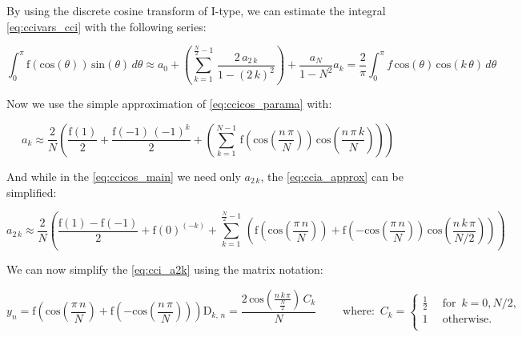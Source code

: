 \documentclass[12pt,twoside,a4paper]{article}
\numberwithin{equation}{subsection}
\numberwithin{figure}{subsection}
\begin{document}
By using the discrete cosine transform of I-type, we can estimate the integral \ref{eq:ccivars_cci} with the following series:

\begin{subequations} \label{eq:cci_costrans}
  \begin{equation}   \label{eq:ccicos_main}
    \int_{0}^{\pi }\mathrm{f}(\mathrm{cos}(\theta ))\,\mathrm{sin}(\theta )\,d\theta \approx {a_{0}} +  \left( \! \sum_{k=1}^{\frac
    {N}{2} - 1}\,\frac {2\, {a_{2\,k}}}{1 - (2\,k)^{2}} \!  \right) + \frac {{a_{N}}}{1 - N ^{2}}  
  \end{equation}
  \begin{equation}   \label{eq:ccicos_parama}
    {a_{k}}=\frac {2}{\pi } \int_{0}^{\pi }f\,\mathrm{cos}(\theta )\, \mathrm{cos}(k\,\theta )\,d\theta   
  \end{equation}
\end{subequations}

Now we use the simple approximation of \ref{eq:ccicos_parama} with:

\begin{equation} \label{eq:ccia_approx}
  {a_{k}} \approx \frac {2}{N} \left(\! \frac {\mathrm{f}(1)}{2} + \frac {\mathrm{f}( - 1)\,( - 1)^{k}}{2} +  \left( \!
  \sum_{k=1}^{N - 1}\, \mathrm{f}(\mathrm{cos}(\frac {n\,\pi }{N}))\,\mathrm{cos}(\frac {n\,\pi \,k}{N}) \!  \right)  \right) 
\end{equation}
 
And while in the \ref{eq:ccicos_main} we need only ${a_{2\,k}}$, the \ref{eq:ccia_approx} can be simplified:

\begin{equation} \label{eq:cci_a2k}
  {a_{2\,k}} \approx \frac {2}{N}  \left(  \frac {\mathrm{f}(1) - \mathrm{f}( - 1)}{2} + \mathrm{f}(0)^{( - k)}
  +    \! \sum_{k=1}^{\frac {N}{2} - 1}\, \left(  \! \mathrm{f}(\mathrm{cos}(\frac {\pi \,n}{N}))+ \mathrm{f}( - \mathrm{cos}(\frac {\pi
  \,n}{N}))\,\mathrm{cos} \left(  \! \frac {n\,k\,\pi }{N/2} \!  \right)   \right) 
  \right)
\end{equation}

We can now simplify the \ref{eq:cci_a2k} using the matrix notation:

\begin{subequations} \label{eq:cci_matrix}
  \begin{equation}   \label{eq:ccimatrix_yn}
    {y_{n}}=\mathrm{f}(\mathrm{cos}(\frac {\pi \,n}{N}) + \mathrm{f}( - \mathrm{cos}(\frac {n\,\pi }{N})))  
  \end{equation}
  \begin{equation}   \label{eq:ccimatrix_dkn}
    {\mathrm{D}_{k, \,n}}=\frac {2\,\mathrm{cos} \left(  \! \frac {n\,k\,\pi }{\frac {N}{2}} \!  \right) \,{C_{k}}}{N}
    \qquad \mbox{ where: }\, {C_{k}} = 
    \begin{cases} 
      \frac {1}{2}\, & \mbox{ for }\,k = 0, N/2, \\ 
      1 & \mbox{ otherwise. } \\
    \end{cases}
  \end{equation}
\end{subequations}
\end{document}
